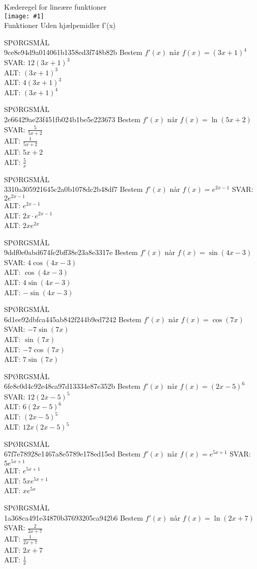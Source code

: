 \documentclass[]{article}
\newcounter{spgcounter}
\newenvironment{question}[2]{\addtocounter{spgcounter}{1} SPØRGSMÅL \thespgcounter\\}{\hspace{50px}}
\newcommand{\name}[1]{{\huge #1}\\}
\newcommand{\tag}[1]{#1}
\newcommand{\cover}[1]{\texttt{[image: \#1]}\\}
\newcommand{\answer}[1]{{\color{green} SVAR: #1}\\}
\newcommand{\alt}[1]{{\color{red} ALT: #1}\\}
\begin{document}
\name{Kæderegel for lineære funktioner}
\cover{lineærekæderegel.png}
\tag{Funktioner}
\tag{Uden hjælpemidler}
\tag{f'(x)}

\begin{question}{multi}\id{9ce8e94d9a014061b1358ed3f748b82b}
    Bestem $f'(x)$ når $f(x)=(3x + 1)^4$
    \answer{$12(3x+1)^3$}
    \alt{$(3x+1)^3$}
    \alt{$4(3x+1)^3$}
    \alt{$(3x+1)^4$}
    \end{question}
    
    \begin{question}{multi}\id{2e66429ae23f451fb024b1be5e223673}
    Bestem $f'(x)$ når $f(x)=\ln(5x + 2)$
    \answer{$\frac{5}{5x+2}$}
    \alt{$\frac{1}{5x+2}$}
    \alt{$5x + 2$}
    \alt{$\frac{5}{x}$}
    \end{question}
    
    \begin{question}{multi}\id{3310a305921645c2a0b1078dc2b48df7}
    Bestem $f'(x)$ når $f(x)=e^{2x - 1}$
    \answer{$2e^{2x-1}$}
    \alt{$e^{2x-1}$}
    \alt{$2x \cdot e^{2x-1}$}
    \alt{$2xe^{2x}$}
    \end{question}
    
    \begin{question}{multi}\id{9ddf0e0abd674fe2bff38e23a8e3317e}
    Bestem $f'(x)$ når $f(x)=\sin(4x - 3)$
    \answer{$4\cos(4x - 3)$}
    \alt{$\cos(4x - 3)$}
    \alt{$4\sin(4x - 3)$}
    \alt{$-\sin(4x-3)$}
    \end{question}
    
    \begin{question}{multi}\id{6d1ee92dbfca445ab842f244b9ed7242}
    Bestem $f'(x)$ når $f(x)=\cos(7x)$
    \answer{$-7\sin(7x)$}
    \alt{$\sin(7x)$}
    \alt{$-7\cos(7x)$}
    \alt{$7\sin(7x)$}
    \end{question}
    
    \begin{question}{multi}\id{6fe8c0d4c92e48ca97d13334e87c352b}
    Bestem $f'(x)$ når $f(x)=(2x-5)^6$
    \answer{$12(2x-5)^5$}
    \alt{$6(2x-5)^6$}
    \alt{$(2x-5)^5$}
    \alt{$12x(2x-5)^5$}
    \end{question}
    
    \begin{question}{multi}\id{67f7e78928e1467a8e5789e178ed15ed}
    Bestem $f'(x)$ når $f(x)=e^{5x+1}$
    \answer{$5e^{5x+1}$}
    \alt{$e^{5x+1}$}
    \alt{$5xe^{5x+1}$}
    \alt{$x e^{5x}$}
    \end{question}
    
    \begin{question}{multi}\id{1a368ca491e34870b37693205ca942b6}
    Bestem $f'(x)$ når $f(x)=\ln(2x+7)$
    \answer{$\frac{2}{2x+7}$}
    \alt{$\frac{1}{2x+7}$}
    \alt{$2x+7$}
    \alt{$\frac{1}{x}$}
    \end{question}
    
\end{document}
